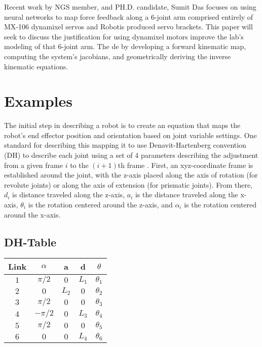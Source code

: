 \documentclass[10pt,journal]{IEEEtran}
\begin{document}
Recent work by NGS member, and PH.D. candidate, Sumit Das focuses on using neural networks to map force feedback along a 6-joint arm comprised entirely of MX-106 dynamixel servos and Robotis produced servo brackets. This paper will seek to discuss the justification for using dynamixel motors improve the lab's modeling of that 6-joint arm. The de by developing a forward kinematic map, computing the system's jacobians, and geometrically deriving the inverse kinematic equations. 

\section{Examples} %
The initial step in describing a robot is to create an equation that maps the robot's end effector position and orientation based on joint variable settings. One standard for describing this mapping it to use Denavit-Hartenberg convention (DH) to describe each joint using a set of 4 parameters describing the adjustment from a given frame $i$ to the $(i+1)$th frame \cite{siciliano2009robotics}. First, an xyz-coordinate frame is established around the joint, with the z-axis placed along the axis of rotation (for revolute joints) or along the axis of extension (for prismatic joints). From there, $d_i$ is distance traveled along the z-axis, $a_i$ is the distance traveled along the x-axis, $\theta_i$ is the rotation centered around the z-axis, and $\alpha_i$ is the rotation centered around the x-axis.

\subsection{DH-Table}
\begin{center}
\begin{tabular}{ | c | c | c | c | c | } 
		\hline
		Link   & $\alpha$ & a     & d     & $\theta$   \\
\hline\hline
		$1$    & $\pi/2$  & $0$   & $L_1$ & $\theta_1$ \\
\hline
		$2$    & $0$      & $L_2$ & $0$   & $\theta_2$ \\
\hline
		$3$    & $\pi/2$  & $0$   & $0$   & $\theta_3$ \\
\hline
		$4$    & $-\pi/2$ & $0$   & $L_3$   & $\theta_4$ \\
\hline
		$5$    & $\pi/2$  & $0$   & $0$   & $\theta_5$ \\
\hline
		$6$    & $0$      & $0$   & $L_4$ & $\theta_6$ \\
		\hline
	\end{tabular}
\end{center}
\end{document}

